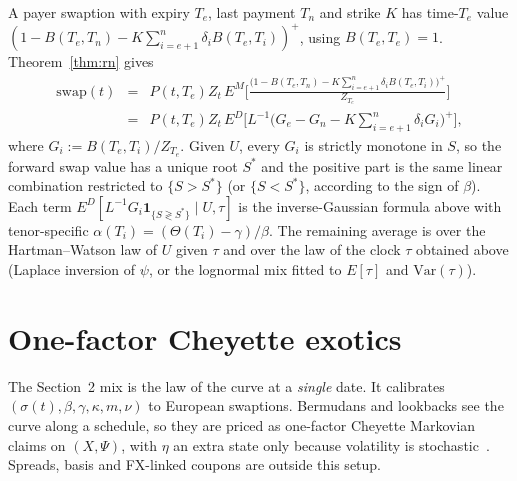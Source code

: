 \documentclass[12pt,a4paper,final]{article}
\theoremstyle{plain}
\begin{document}
A payer swaption with expiry $T_{e}$, last payment $T_{n}$ and strike $K$ has
time-$T_{e}$ value
$(1-B(T_{e},T_{n})-K\sum_{i=e+1}^{n}\delta_{i}B(T_{e},T_{i}))^{+}$,
using $B(T_{e},T_{e})=1$. Theorem~\ref{thm:rn} gives
\begin{eqnarray*}
\mathrm{swap}(t)
&=&P(t,T_{e})Z_{t}\,
E^{M}\Biggl[
\frac{
\bigl(1-B(T_{e},T_{n})-K\sum_{i=e+1}^{n}\delta_{i}B(T_{e},T_{i})\bigr)^{+}
}{Z_{T_{e}}}
\Biggr]\\
&=&P(t,T_{e})Z_{t}\,
E^{D}\Biggl[
L^{-1}
\bigl(G_{e}-G_{n}-K\sum_{i=e+1}^{n}\delta_{i}G_{i}\bigr)^{+}
\Biggr],
\end{eqnarray*}
where $G_{i}:=B(T_{e},T_{i})/Z_{T_{e}}$. Given $U$, every $G_{i}$ is strictly
monotone in $S$, so the forward swap value has a unique root $S^{*}$ and the
positive part is the same linear combination restricted to $\{S>S^{*}\}$ (or
$\{S<S^{*}\}$, according to the sign of $\beta$). Each term
$E^{D}[L^{-1}G_{i}\mathbf{1}_{\{S\gtrless S^{*}\}}\mid U,\tau]$ is the
inverse-Gaussian formula above with tenor-specific
$\alpha(T_{i})=(\Theta(T_{i})-\gamma)/\beta$. The remaining average is over
the Hartman--Watson law of $U$ given $\tau$ and over the law of the clock
$\tau$ obtained above (Laplace inversion of $\psi$, or the lognormal mix
fitted to $E[\tau]$ and $\mathrm{Var}(\tau)$).

\section{One-factor Cheyette exotics}
The Section~2 mix is the law of the curve at a \emph{single} date. It
calibrates $(\sigma(t),\beta,\gamma,\kappa,m,\nu)$ to European swaptions.
Bermudans and lookbacks see the curve along a schedule, so they are priced
as one-factor Cheyette Markovian claims on $(X,\Psi)$, with $\eta$ an extra
state only because volatility is stochastic~\cite{lognormal_vol}. Spreads,
basis and FX-linked coupons are outside this setup.
\end{document}
